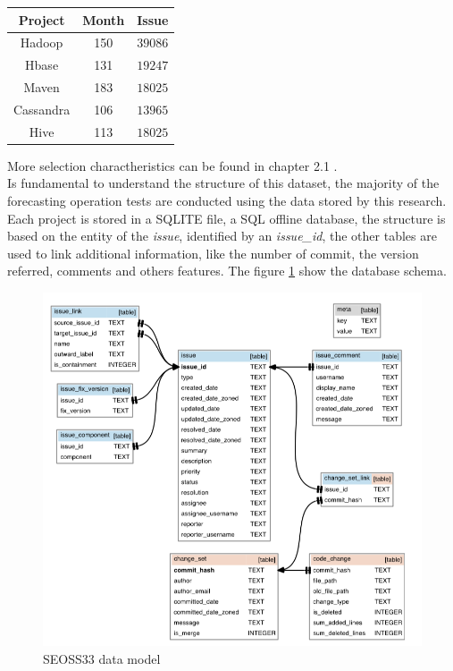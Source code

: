 \documentclass[%
    corpo=12pt,
    twoside,
    oldstyle,
    autoretitolo,
    greek,
    evenboxes,
]{toptesi}
\begin{document}
\begin{center}
   \label{tab:seoss33_selected}
  \begin{tabular}{ |c|c|c| }
     \hline
     \textbf{Project} & \textbf{Month} & \textbf{Issue} \\
     \hline
     \hline
     Hadoop & 150 & $39086$ \\
     Hbase & 131 & $19247$ \\
     Maven & 183 & $18025$ \\
     Cassandra & 106 & $13965$ \\
     Hive & 113 & $18025$ \\
     \hline
  \end{tabular}
\end{center}

More selection charactheristics can be found in chapter 2.1 \cite{SEOSS33}.\\
Is fundamental to understand the structure of this dataset, the majority of the forecasting operation tests are conducted using the data stored by this research.\\
Each project is stored in a SQLITE file, a SQL offline database, the structure is based on the entity of the \textit{issue}, identified by an \textit{issue\_id}, the other tables are used to link additional information, like the number of commit, the version referred, comments and others features. The figure \ref{fig:seoss33_db} show the database schema.

\begin{figure}[!h]
  \includegraphics[width=\linewidth]{figure/seoss33_db_schema.png}
  \caption{SEOSS33 data model}
  \label{fig:seoss33_db}
\end{figure}
\end{document}

